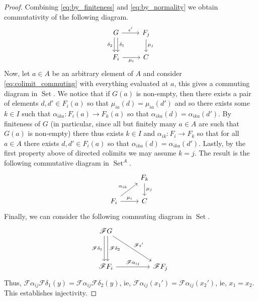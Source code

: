 \documentclass[12pt]{article}
\theoremstyle{plain}
\theoremstyle{definition}
\newcommand{\scr}[1]{\mathscr{#1}}
\newcommand{\lto}{\longrightarrow}
\DeclareMathOperator{\set}{Set}
\begin{document}
\begin{proof}
		Combining \eqref{eq:by_finiteness} and \eqref{eq:by_normality} we obtain commutativity of the following diagram.
		\begin{equation}\label{eq:colimit_commuting}
			\begin{tikzcd}
				G\arrow[r,"{\epsilon'}"]\arrow[d,shift left,"{\delta_1}"]\arrow[d, swap, shift right, "{\delta_2}"] & F_j\arrow[d,"{\mu_j}"]\\
				F_i\arrow[r,swap,"{\mu_i}"] & C
				\end{tikzcd}
			\end{equation}
		Now, let $a \in A$ be an arbitrary element of $A$ and consider \eqref{eq:colimit_commuting} with everything evaluated at $a$, this gives a commuting diagram in $\set$. We notice that if $G(a)$ is non-empty, then there exists a pair of elements $d,d' \in F_i(a)$ so that $\mu_{ia}(d) = \mu_{ia}(d')$ and so there exists some $k \in I$ such that $\alpha_{ika}: F_{i}(a) \lto F_k(a)$ so that $\alpha_{ika}(d) = \alpha_{ika}(d')$. By finiteness of $G$ (in particular, since all but finitely many $a \in A$ are such that $G(a)$ is non-empty) there thus exists $k \in I$ and $\alpha_{ik}: F_i \lto F_k$ so that for all $a \in A$ there exists $d,d' \in F_i(a)$ so that $\alpha_{ika}(d) = \alpha_{ika}(d')$. Lastly, by the first property above of directed colimits we may assume $k = j$. The result is the following commutative diagram in $\set^A$.
		\begin{equation}
			\begin{tikzcd}
				& F_k\arrow[d,"{\mu_j}"]\\
				F_i\arrow[ur,"{\alpha_{ik}}"]\arrow[r,"{\mu_i}"] & C
				\end{tikzcd}
			\end{equation}
		Finally, we can consider the following commuting diagram in $\set$.
		\begin{equation}
			\begin{tikzcd}[column sep = huge, row sep = huge]
			\scr{F}G\arrow[dr,"{\scr{F}\epsilon'}"]\arrow[d,shift right, swap, "{\scr{F}\delta_1}"]\arrow[d,shift left, "{\scr{F}\delta_2}"]\\
			\scr{F}F_i\arrow[r,"{\scr{F}\alpha_{ij}}"]& \scr{F}F_j
			\end{tikzcd}
			\end{equation}
		Thus, $\scr{F}\alpha_{ij}\scr{F}\delta_1(y) = \scr{F}\alpha_{ij}\scr{F}\delta_2(y)$, ie, $\scr{F}\alpha_{ij}(x_1') = \scr{F}\alpha_{ij}(x_2')$, ie, $x_1 = x_2$. This establishes injectivity.

\end{proof}
\end{document}
